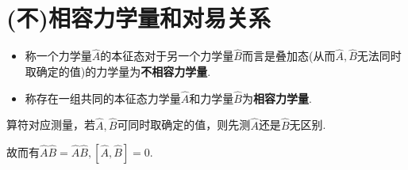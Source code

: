 \section{(不)相容力学量和对易关系}
\begin{definition}
    \begin{itemize}
        \item 称一个力学量$\hat{A}$的本征态对于另一个力学量$\hat{B}$而言是叠加态(从而$\hat{A},\hat{B}$无法同时取确定的值)的力学量为\textbf{不相容力学量}.
        \item 称存在一组共同的本征态力学量$\hat{A}$和力学量$\hat{B}$为\textbf{相容力学量}.
    \end{itemize}
\end{definition}

算符对应测量，若$\hat{A},\hat{B}$可同时取确定的值，则先测$\hat{A}$还是$\hat{B}$无区别.

故而有$\hat{A}\hat{B}=\hat{A}\hat{B},[\hat{A},\hat{B}]=0$.

